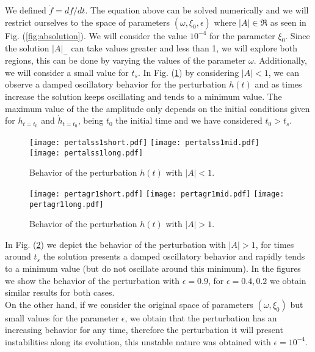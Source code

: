 \documentclass[twocolumn,showpacs,nofootinbib,floats,amsmath,amssymb]{revtex4}
\begin{document}
We defined $\dot{f} = df/dt$. The equation above can be solved numerically and we will restrict ourselves to the space of parameters $(\omega, \xi_{0}, \epsilon)$ where $\left|A\right| \in \Re$ as seen in Fig. (\ref{fig:absolution}). We will consider the value $10^{-4}$ for the parameter $\xi_{0}$. Since the solution $\left|A\right|_{-}$ can take values greater and less than 1, we will explore both regions, this can be done by varying the values of the parameter $\omega$. Additionally, we will consider a small value for $t_{s}$. In Fig. (\ref{fig:pert1}) by considering $\left|A\right| < 1$, we can observe a damped oscillatory behavior for the perturbation $h(t)$ and as times increase the solution keeps oscillating and tends to a minimum value. The maximum value of the the amplitude only depends on the initial conditions given for $h_{t=t_{0}}$ and $\dot{h}_{t=t_{0}}$, being $t_{0}$ the initial time and we have considered $t_{0} > t_{s}$. 
\onecolumngrid

\begin{figure}[H]
\centering
\texttt{[image: pertalss1short.pdf]}
\texttt{[image: pertalss1mid.pdf]}
\texttt{[image: pertalss1long.pdf]}
\caption{Behavior of the perturbation $h(t)$ with $\left|A\right| < 1$.} 
\label{fig:pert1}
\end{figure}
  
\begin{figure}[H]
\centering
\texttt{[image: pertagr1short.pdf]}
\texttt{[image: pertagr1mid.pdf]}
\texttt{[image: pertagr1long.pdf]}
\caption{Behavior of the perturbation $h(t)$ with $\left|A\right| > 1$.} 
\label{fig:pert2}
\end{figure}
\twocolumngrid
In Fig. (\ref{fig:pert2}) we depict the behavior of the perturbation with $\left|A\right| > 1$, for times around $t_{s}$ the solution presents a damped oscillatory behavior and rapidly tends to a minimum value (but do not oscillate around this minimum). In the figures we show the behavior of the perturbation with $\epsilon = 0.9$, for $\epsilon = 0.4, 0.2$ we obtain similar results for both cases.\\ 
On the other hand, if we consider the original space of parameters $(\omega, \xi_{0})$ but small values for the parameter $\epsilon$, we obtain that the perturbation has an increasing behavior for any time, therefore the perturbation it will present instabilities along its evolution, this unstable nature was obtained with $\epsilon = 10^{-4}$.
\end{document}
